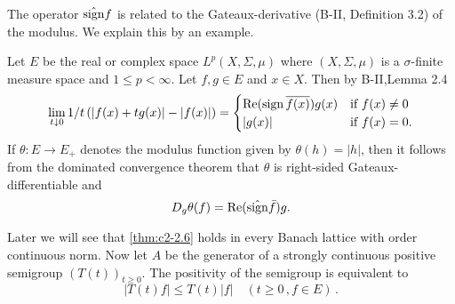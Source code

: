 The operator $\hat{\operatorname{sign}} f$ is related to the Gateaux-derivative (B-II, Definition 3.2) 
of the modulus.
We explain this by an example.

\begin{example}\label{ex:c2-2.3}
Let $E$ be the real or complex space $L^p(X,\Sigma,\mu)$ where $(X,\Sigma,\mu)$ is a $\sigma$-finite measure space and $1 \leq p < \infty$.
Let $f,g \in E$ and $x \in X$.
Then by B-II,Lemma 2.4 
\begin{align*}
\lim_{t \downarrow 0} 1/t\, (|f(x)+tg(x)|-|f(x)|) = 
\begin{cases}
    \mathop{}\!\mathrm{Re} (\operatorname{sign} \overline{f(x)})g(x) & \text{if } f(x) \neq 0 \\
    |g(x)| & \text{if } f(x) = 0.
\end{cases}
\end{align*}
If $\theta : E \to E_{+}$ denotes the modulus function given by $\theta(h) = |h|$, then it follows from the dominated convergence theorem that $\theta$ is right-sided Gateaux-differentiable and
\begin{equation}\label{eq:c2-2.6}
D_{g}\theta(f) = \text{Re}(\hat{\operatorname{sign}} \bar{f})g.
\end{equation}
\end{example}
Later we will see that \ref{thm:c2-2.6}   holds in every Banach lattice with order continuous norm.
Now let $A$ be the generator of a strongly continuous positive semigroup $(T(t))_{t \geq 0}$.
The positivity of the semigroup is equivalent to
\begin{equation}\label{eq:c2-2.7}
|T(t)f| \leq T(t)|f| \quad (t \geq 0 \,, f \in E) \,.
\end{equation}

